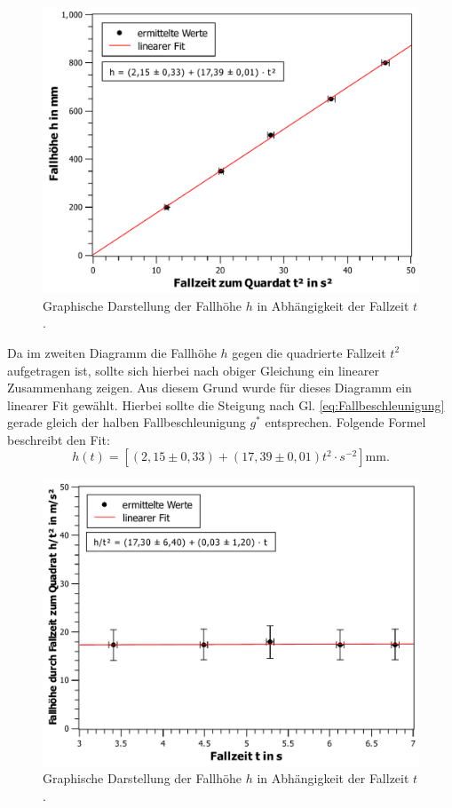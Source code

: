 			\begin{figure}[ht]
				\centering
				\includegraphics[width=\textwidth]{h-gegen-t2.pdf}
				\caption{Graphische Darstellung der Fallhöhe $h$ in Abhängigkeit der Fallzeit $t$.}
				\label{fig:hgegent2}	
			\end{figure}	
			Da im zweiten Diagramm die Fallhöhe $h$ gegen die quadrierte Fallzeit $t^2$ aufgetragen ist, sollte sich hierbei nach obiger Gleichung ein linearer Zusammenhang zeigen. Aus diesem Grund wurde für dieses Diagramm ein linearer Fit gewählt. Hierbei sollte die Steigung nach Gl. \ref{eq:Fallbeschleunigung} gerade gleich der halben Fallbeschleunigung $g^{*}$ entsprechen. Folgende Formel beschreibt den Fit:
			\begin{equation*}
				h(t) = [(2,15 \pm 0,33)+(17,39 \pm 0,01)t^2\cdot\si{s^{-2}}]\si{\mm}.
			\end{equation*} 
			\begin{figure}[ht]
				\centering
				\includegraphics[width=\textwidth]{ht2-gegen-t.pdf}
				\caption{Graphische Darstellung der Fallhöhe $h$ in Abhängigkeit der Fallzeit $t$.}
				\label{fig:ht2gegent}	
			\end{figure}
